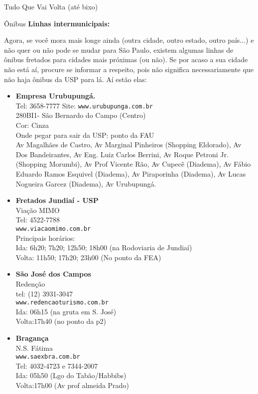 \begin{secao}{Tudo Que Vai Volta (até bixo)}
\begin{subsecao}{Ônibus}
{\bf Linhas intermunicipais:}

Agora, se você mora mais longe ainda (outra cidade, outro estado, outro país...) e não quer ou não pode se mudar para São Paulo, existem algumas linhas de ônibus fretados para cidades mais próximas (ou não). Se por acaso a sua cidade não está aí, procure se informar a respeito, pois não significa necessariamente que não haja ônibus da USP para lá. Aí estão elas:

\begin{itemize}
  \item {\bf Empresa Urubupungá.}\\
    Tel: 3658-7777
    Site: {\tt www.urubupunga.com.br}\\
    280BI1- São Bernardo do Campo (Centro)\\
    Cor: Cinza\\
    Onde pegar para sair da USP: ponto da FAU\\
    Av Magalhães de Castro, Av Marginal Pinheiros (Shopping Eldorado), Av Dos
    Bandeirantes, Av Eng. Luiz Carlos Berrini, Av Roque Petroni Jr. (Shopping
    Morumbi), Av Prof Vicente Rão, Av Cupecê (Diadema), Av Fábio Eduardo Ramos
    Esquivel (Diadema), Av Piraporinha (Diadema), Av Lucas Nogueira Garcez
    (Diadema), Av Urubupungá.

  \item {\bf Fretados Jundiaí - USP}\\
    Viação MIMO\\
    Tel: 4522-7788\\
    {\tt www.viacaomimo.com.br}\\
    Principais horários:\\
    Ida: 6h20; 7h20; 12h50; 18h00 (na Rodoviaria de Jundiaí)\\
    Volta: 11h50; 17h20; 23h00 (No ponto da FEA)

  \item {\bf São José dos Campos}\\
    Redenção\\
    tel: (12) 3931-3047\\
    {\tt www.redencaoturismo.com.br}\\
    Ida: 06h15 (na gruta em S. José)\\
    Volta:17h40 (no ponto da p2)

  \item {\bf Bragança}\\
    N.S. Fátima\\
    {\tt www.saexbra.com.br}\\
    Tel: 4032-4723 e 7344-2007\\
    Ida: 05h50 (Lgo do Tabão/Habbibs)\\
    Volta:17h00 (Av prof almeida Prado)


\end{itemize}
\end{subsecao}
\end{secao}
